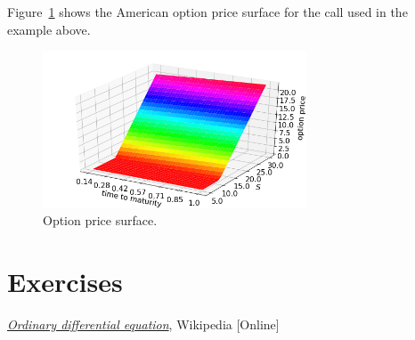 Figure~\ref{fig:american_call_surface} shows the American option price surface for the call used in the example above.
\begin{figure}[htb]
	\centering
	\includegraphics[width=0.7\textwidth]{figures/american_call_surface}
	\caption{Option price surface.}
	\label{fig:american_call_surface}
\end{figure} 

\section*{Exercises}


\begin{thebibliography}{9}
\href{https://en.wikipedia.org/wiki/Ordinary_differential_equation}{\emph{Ordinary differential equation}}, Wikipedia [Online]
\end{thebibliography}


